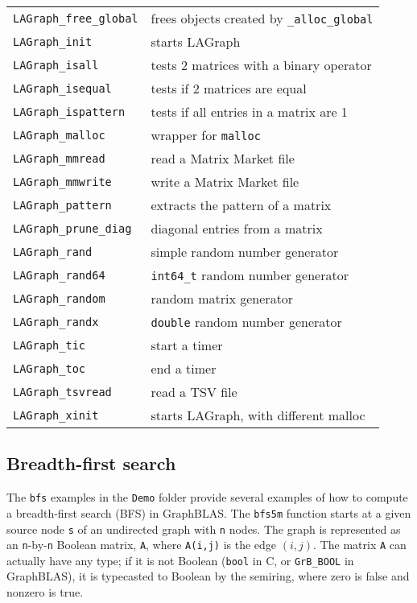 \documentclass[12pt]{article}
\begin{document}
{\begin{tabular}{ll}
\verb'LAGraph_free_global'      & frees objects created by \verb'_alloc_global'\\
\verb'LAGraph_init'             & starts LAGraph \\
\verb'LAGraph_isall'            & tests 2 matrices with a binary operator \\
\verb'LAGraph_isequal'          & tests if 2 matrices are equal \\
\verb'LAGraph_ispattern'        & tests if all entries in a matrix are 1 \\
\verb'LAGraph_malloc'           & wrapper for \verb'malloc' \\
\verb'LAGraph_mmread'           & read a Matrix Market file \\
\verb'LAGraph_mmwrite'          & write a Matrix Market file \\
\verb'LAGraph_pattern'          & extracts the pattern of a matrix \\
\verb'LAGraph_prune_diag'       & diagonal entries from a matrix \\
\verb'LAGraph_rand'             & simple random number generator \\
\verb'LAGraph_rand64'           & \verb'int64_t' random number generator \\
\verb'LAGraph_random'           & random matrix generator \\
\verb'LAGraph_randx'            & \verb'double' random number generator \\
\verb'LAGraph_tic'              & start a timer \\
\verb'LAGraph_toc'              & end a timer \\
\verb'LAGraph_tsvread'          & read a TSV file \\
\verb'LAGraph_xinit'            & starts LAGraph, with different malloc \\
\end{tabular}}

\newpage
\subsection{Breadth-first search}
\label{bfs}

The \verb'bfs' examples in the \verb'Demo' folder provide several examples of
how to compute a breadth-first search (BFS) in GraphBLAS.  The \verb'bfs5m'
function starts at a given source node \verb's' of an undirected graph with
\verb'n' nodes.  The graph is represented as an \verb'n'-by-\verb'n'
Boolean matrix, \verb'A', where \verb'A(i,j)' is the edge $(i,j)$.  The matrix
\verb'A' can actually have any type; if it is not Boolean (\verb'bool' in C, or
\verb'GrB_BOOL' in GraphBLAS), it is typecasted to Boolean by the semiring,
where zero is false and nonzero is true.
\end{document}
